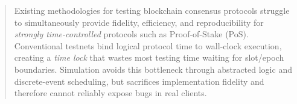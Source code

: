 \begin{abstract}
        
    
Existing methodologies for testing blockchain consensus protocols struggle to simultaneously provide fidelity, efficiency, and reproducibility for \emph{strongly time-controlled} protocols such as Proof-of-Stake (PoS). Conventional testnets bind logical protocol time to wall-clock execution, creating a \emph{time lock} that wastes most testing time waiting for slot/epoch boundaries. Simulation avoids this bottleneck through abstracted logic and discrete-event scheduling, but sacrifices implementation fidelity and therefore cannot reliably expose bugs in real clients.
    

\end{abstract}
